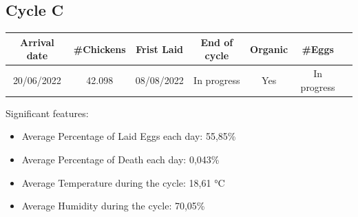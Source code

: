 \documentclass[11pt]{article}
\begin{document}
\subsection{Cycle C}
\begin{center}
    \begin{tabular}{| c | c | c | c | c | c | c |} 
        \hline
        Arrival date & \#Chickens & Frist Laid & End of cycle & Organic & \#Eggs\\ [0.5ex] 
        \hline
        20/06/2022 & 42.098 & 08/08/2022 & In progress & Yes & In progress\\ 
        \hline
    \end{tabular}
\end{center}

Significant features:
\begin{itemize}
    \item Average Percentage of Laid Eggs each day: 55,85\%
    \item Average Percentage of Death each day: 0,043\%
    \item Average Temperature during the cycle: 18,61 °C
    \item Average Humidity during the cycle: 70,05\%
\end{itemize}
\end{document}
